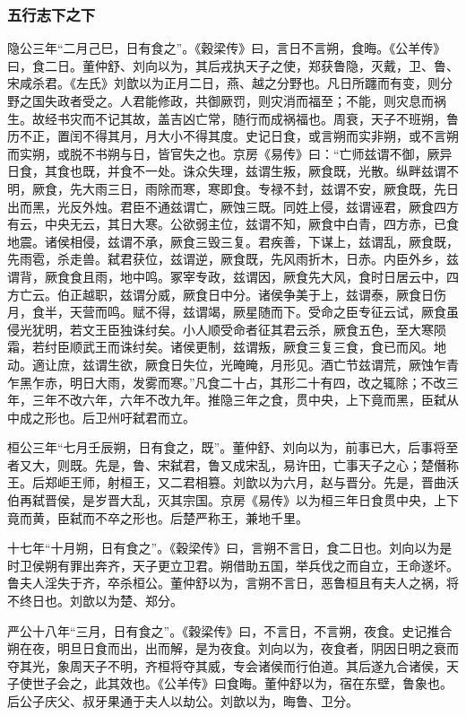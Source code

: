 \documentclass[]{article}
\begin{document}
\hypertarget{header-n2386}{%
\subsubsection{五行志下之下}\label{header-n2386}}

隐公三年``二月己巳，日有食之''。《穀梁传》曰，言日不言朔，食晦。《公羊传》曰，食二日。董仲舒、刘向以为，其后戎执天子之使，郑获鲁隐，灭戴，卫、鲁、宋咸杀君。《左氏》刘歆以为正月二日，燕、越之分野也。凡日所躔而有变，则分野之国失政者受之。人君能修政，共御厥罚，则灾消而福至；不能，则灾息而祸生。故经书灾而不记其故，盖吉凶亡常，随行而成祸福也。周衰，天子不班朔，鲁历不正，置闰不得其月，月大小不得其度。史记日食，或言朔而实非朔，或不言朔而实朔，或脱不书朔与日，皆官失之也。京房《易传》曰：``亡师兹谓不御，厥异日食，其食也既，并食不一处。诛众失理，兹谓生叛，厥食既，光散。纵畔兹谓不明，厥食，先大雨三日，雨除而寒，寒即食。专禄不封，兹谓不安，厥食既，先日出而黑，光反外烛。君臣不通兹谓亡，厥蚀三既。同姓上侵，兹谓诬君，厥食四方有云，中央无云，其日大寒。公欲弱主位，兹谓不知，厥食中白青，四方赤，已食地震。诸侯相侵，兹谓不承，厥食三毁三复。君疾善，下谋上，兹谓乱，厥食既，先雨雹，杀走兽。弑君获位，兹谓逆，厥食既，先风雨折木，日赤。内臣外乡，兹谓背，厥食食且雨，地中鸣。冢宰专政，兹谓因，厥食先大风，食时日居云中，四方亡云。伯正越职，兹谓分威，厥食日中分。诸侯争美于上，兹谓泰，厥食日伤月，食半，天营而鸣。赋不得，兹谓竭，厥星随而下。受命之臣专征云试，厥食虽侵光犹明，若文王臣独诛纣矣。小人顺受命者征其君云杀，厥食五色，至大寒陨霜，若纣臣顺武王而诛纣矣。诸侯更制，兹谓叛，厥食三复三食，食已而风。地动。適让庶，兹谓生欲，厥食日失位，光晻晻，月形见。酒亡节兹谓荒，厥蚀乍青乍黑乍赤，明日大雨，发雾而寒。''凡食二十占，其形二十有四，改之辄除；不改三年，三年不改六年，六年不改九年。推隐三年之食，贯中央，上下竟而黑，臣弑从中成之形也。后卫州吁弑君而立。

桓公三年``七月壬辰朔，日有食之，既''。董仲舒、刘向以为，前事已大，后事将至者又大，则既。先是，鲁、宋弑君，鲁又成宋乱，易许田，亡事天子之心；楚僭称王。后郑岠王师，射桓王，又二君相篡。刘歆以为六月，赵与晋分。先是，晋曲沃伯再弑晋侯，是岁晋大乱，灭其宗国。京房《易传》以为桓三年日食贯中央，上下竟而黄，臣弑而不卒之形也。后楚严称王，兼地千里。

十七年``十月朔，日有食之''。《穀梁传》曰，言朔不言日，食二日也。刘向以为是时卫侯朔有罪出奔齐，天子更立卫君。朔借助五国，举兵伐之而自立，王命遂坏。鲁夫人淫失于齐，卒杀桓公。董仲舒以为，言朔不言日，恶鲁桓且有夫人之祸，将不终日也。刘歆以为楚、郑分。

严公十八年``三月，日有食之''。《穀梁传》曰，不言日，不言朔，夜食。史记推合朔在夜，明旦日食而出，出而解，是为夜食。刘向以为，夜食者，阴因日明之衰而夺其光，象周天子不明，齐桓将夺其威，专会诸侯而行伯道。其后遂九合诸侯，天子使世子会之，此其效也。《公羊传》曰食晦。董仲舒以为，宿在东壁，鲁象也。后公子庆父、叔牙果通于夫人以劫公。刘歆以为，晦鲁、卫分。
\end{document}
